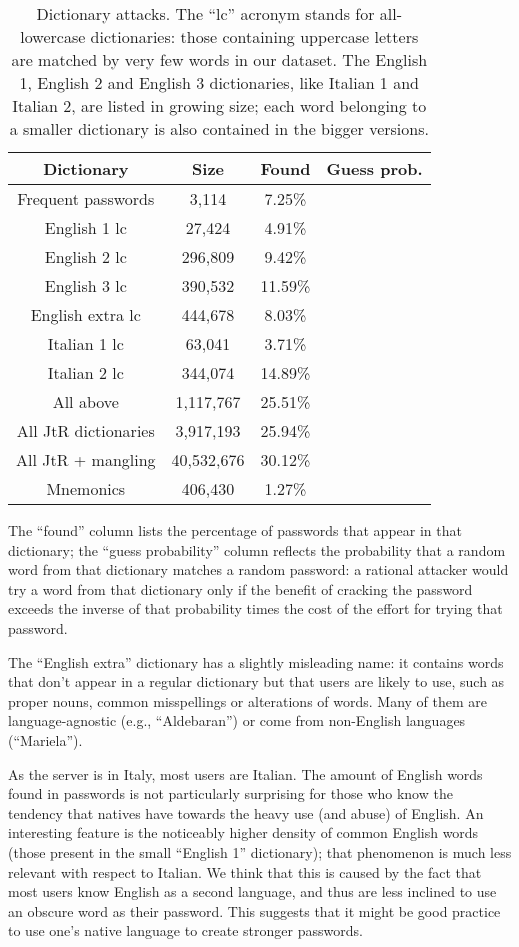 \documentclass[a4paper,twocolumn]{article}
\providecommand{\tabularnewline}{\\}
\begin{document}
\begin{table}
\begin{centering}
\begin{tabular}{|c|c|c|c|}
\hline 
Dictionary & Size & Found & Guess prob.\tabularnewline
\hline
\hline 
Frequent passwords & 3,114 & 7.25\% & \tabularnewline
\hline 
English 1 lc & 27,424 & 4.91\% & \tabularnewline
\hline 
English 2 lc & 296,809 & 9.42\% & \tabularnewline
\hline 
English 3 lc & 390,532 & 11.59\% & \tabularnewline
\hline 
English extra lc & 444,678 & 8.03\% & \tabularnewline
\hline 
Italian 1 lc & 63,041 & 3.71\% & \tabularnewline
\hline 
Italian 2 lc & 344,074 & 14.89\% & \tabularnewline
\hline 
All above & 1,117,767 & 25.51\% & \tabularnewline
\hline 
All JtR dictionaries & 3,917,193 & 25.94\% & \tabularnewline
\hline 
All JtR + mangling & 40,532,676 & 30.12\% & \tabularnewline
\hline 
Mnemonics \cite{Kuo2006Human} & 406,430 & 1.27\% & \tabularnewline
\hline
\end{tabular}
\par\end{centering}

\caption{\label{tab:Dictionary-attacks}Dictionary attacks. The {}``lc''
acronym stands for all-lowercase dictionaries: those containing uppercase
letters are matched by very few words in our dataset. The English
1, English 2 and English 3 dictionaries, like Italian 1 and Italian
2, are listed in growing size; each word belonging to a smaller dictionary
is also contained in the bigger versions.}

\end{table}


The {}``found'' column lists the percentage of passwords that appear
in that dictionary; the {}``guess probability'' column reflects
the probability that a random word from that dictionary matches a
random password: a rational attacker would try a word from that dictionary
only if the benefit of cracking the password exceeds the inverse of
that probability times the cost of the effort for trying that password.

The {}``English extra'' dictionary has a slightly misleading name:
it contains words that don't appear in a regular dictionary but that
users are likely to use, such as proper nouns, common misspellings
or alterations of words. Many of them are language-agnostic (e.g.,
{}``Aldebaran'') or come from non-English languages ({}``Mariela'').

As the server is in Italy, most users are Italian. The amount of English
words found in passwords is not particularly surprising for those
who know the tendency that natives have towards the heavy use (and
abuse) of English. An interesting feature is the noticeably higher
density of common English words (those present in the small {}``English
1'' dictionary); that phenomenon is much less relevant with respect
to Italian. We think that this is caused by the fact that most users
know English as a second language, and thus are less inclined to use
an obscure word as their password. This suggests that it might be
good practice to use one's native language to create stronger passwords.
\end{document}
